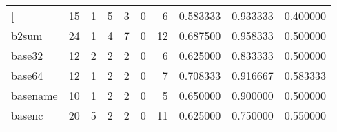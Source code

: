 \begin{longtable}{lrrrrrrrrr}
\bottomrule
\endlastfoot
{[}         &                                      15 &                                                  1 &                                                  5 &                                                  3 &                                                  0 &                                                  6 &                                           0.583333 &                               0.933333 &                             0.400000 \\
b2sum     &                                      24 &                                                  1 &                                                  4 &                                                  7 &                                                  0 &                                                 12 &                                           0.687500 &                               0.958333 &                             0.500000 \\
base32    &                                      12 &                                                  2 &                                                  2 &                                                  2 &                                                  0 &                                                  6 &                                           0.625000 &                               0.833333 &                             0.500000 \\
base64    &                                      12 &                                                  1 &                                                  2 &                                                  2 &                                                  0 &                                                  7 &                                           0.708333 &                               0.916667 &                             0.583333 \\
basename  &                                      10 &                                                  1 &                                                  2 &                                                  2 &                                                  0 &                                                  5 &                                           0.650000 &                               0.900000 &                             0.500000 \\
basenc    &                                      20 &                                                  5 &                                                  2 &                                                  2 &                                                  0 &                                                 11 &                                           0.625000 &                               0.750000 &                             0.550000 \\

\end{longtable}
